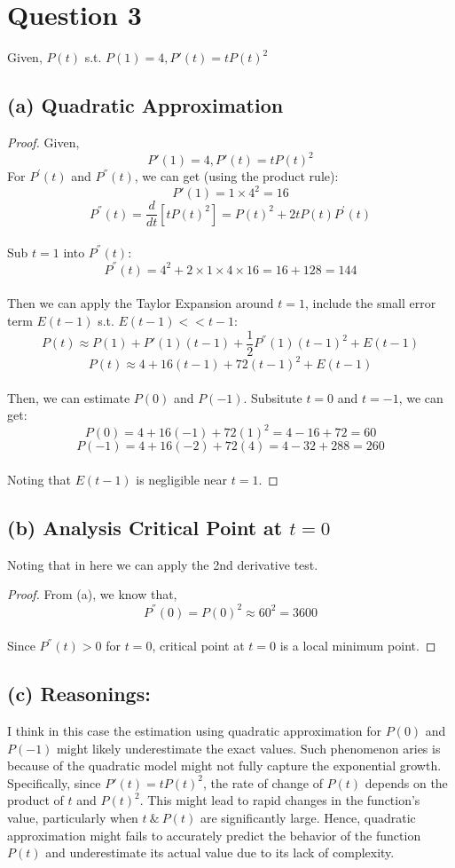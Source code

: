 \documentclass{article}
\begin{document}
\section*{Question 3}
Given, $P(t)$ s.t. $P(1) = 4, P'(t) = tP(t)^2$

\subsection*{(a) Quadratic Approximation}
\begin{proof}
    Given,
    \[ P'(1) = 4, P'(t) = tP(t)^2 \]
    For $P^{'}(t)$ and $P^{''}(t)$, we can get (using the product rule):
    \\
    \[ P'(1) = 1 \times 4^2 = 16 \]
    \[ P^{''}(t) = \frac{d}{dt}[tP(t)^2] = P(t)^2 + 2tP(t)P^{'}(t)\]
    \\
    Sub $t = 1$ into $P^{''}(t)$:
    \[ P^{''}(t) = 4^2 + 2 \times 1 \times 4 \times 16 = 16 + 128 = 144 \]
    \\
    Then we can apply the Taylor Expansion around $t = 1$, include the small error term $E(t-1)$ s.t. $E(t-1) << t-1$:
    \[ P(t) \approx P(1) + P'(1)(t - 1) + \frac{1}{2}P^{''}(1)(t - 1)^2 + E(t - 1) \]
    \[ P(t) \approx 4 + 16(t - 1) + 72(t - 1)^2 + E(t - 1) \]
    \\
    Then, we can estimate $P(0)$ and $P(-1)$. Subsitute $t = 0$ and $t = -1$, we can get:
    \[ P(0) = 4 + 16(-1) + 72(1)^2 = 4 - 16 + 72 = 60 \]
    \[ P(-1) = 4 + 16(-2) + 72(4) = 4 - 32 + 288 = 260 \]
    \\
    Noting that $E(t - 1)$ is negligible near $t = 1$.
\end{proof}

\subsection*{(b) Analysis Critical Point at $t = 0$}
Noting that in here we can apply the 2nd derivative test.
\begin{proof}
    From (a), we know that,
    \[ P^{''}(0) = P(0)^2 \approx 60^2 = 3600 \]
    \\
    Since $P^{''}(t) > 0$ for $t = 0$, critical point at $t = 0$ is a local minimum point.
\end{proof}

\subsection*{(c) Reasonings: }
I think in this case the estimation using quadratic approximation for $P(0)$ and $P(-1)$ might likely underestimate the exact values. Such phenomenon aries is 
because of the quadratic model might not fully capture the exponential growth.
Specifically, since $P'(t) = tP(t)^2$, the rate of change of $P(t)$ depends on the product of $t$ and $P(t)^2$. This might lead to rapid changes in the function's value, 
particularly when $t \ \& \ P(t)$ are significantly large.
Hence, quadratic approximation might fails to accurately predict the behavior of the function $P(t)$ and underestimate its actual value due to its lack of complexity.
\end{document}
